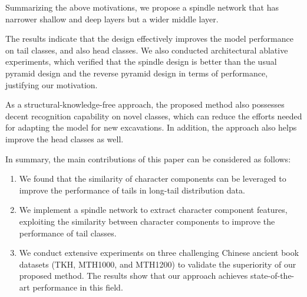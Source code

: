 Summarizing the above motivations, we propose a spindle network that has narrower shallow and deep layers but a wider middle layer. 

The results indicate that the design effectively improves the model performance on tail classes, and also head classes.  
We also conducted architectural ablative experiments, which verified that the spindle design is better than the usual pyramid design and the reverse pyramid design in terms of performance, justifying our motivation.

As a structural-knowledge-free approach, the proposed method also possesses decent recognition capability on novel classes, which can reduce the efforts needed for adapting the model for new excavations. In addition, the approach also helps improve the head classes as well. 

In summary, the main contributions of this paper can be considered as follows:
\begin{enumerate}[noitemsep]
    \item We found that the similarity of character components can be leveraged to improve the performance of tails in long-tail distribution data.
    \item We implement a spindle network to extract character component features, exploiting the similarity between character components to improve the performance of tail classes.
    \item We conduct extensive experiments on three challenging Chinese ancient book datasets (TKH, MTH1000, and MTH1200) to validate the superiority of our proposed method. The results show that our approach achieves state-of-the-art performance in this field.
\end{enumerate}

